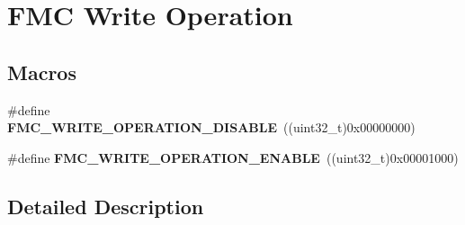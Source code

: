\hypertarget{group___f_m_c___write___operation}{}\section{F\+MC Write Operation}
\label{group___f_m_c___write___operation}
\subsection*{Macros}
\begin{DoxyCompactItemize}
\item 
\#define {\bfseries F\+M\+C\+\_\+\+W\+R\+I\+T\+E\+\_\+\+O\+P\+E\+R\+A\+T\+I\+O\+N\+\_\+\+D\+I\+S\+A\+B\+LE}~((uint32\+\_\+t)0x00000000)\hypertarget{group___f_m_c___write___operation_ga092a1fcc2e841ea9b3498a5a10aa014d}{}\label{group___f_m_c___write___operation_ga092a1fcc2e841ea9b3498a5a10aa014d}

\item 
\#define {\bfseries F\+M\+C\+\_\+\+W\+R\+I\+T\+E\+\_\+\+O\+P\+E\+R\+A\+T\+I\+O\+N\+\_\+\+E\+N\+A\+B\+LE}~((uint32\+\_\+t)0x00001000)\hypertarget{group___f_m_c___write___operation_ga80e96126e1aa1194164504b1e76b5fb6}{}\label{group___f_m_c___write___operation_ga80e96126e1aa1194164504b1e76b5fb6}

\end{DoxyCompactItemize}


\subsection{Detailed Description}

